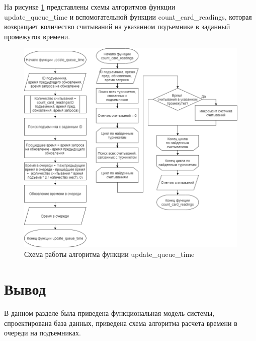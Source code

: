 На рисунке \ref{img:function} представлены схемы алгоритмов функции \\update\_queue\_time и вспомогательной функции count\_card\_readings, которая возвращает количество считываний на указанном подъемнике в заданный промежуток времени.

\clearpage
\begin{figure}[h!]
	\begin{center}
		\includegraphics[scale=0.45]{../imgs/function.png}
	\end{center}
	\captionsetup{justification=centering}
	\caption{Схема работы алгоритма функции update\_queue\_time}
	\label{img:function}
\end{figure}


\section*{Вывод}

В данном разделе была приведена функциональная модель системы, спроектирована база данных, приведена схема алгоритма расчета времени в очереди на подъемниках.




